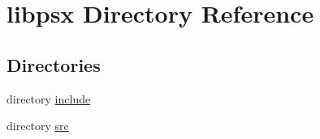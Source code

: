 \hypertarget{dir_000008}{}\section{libpsx Directory Reference}
\label{dir_000008}
\subsection*{Directories}
\begin{DoxyCompactItemize}
\item 
directory \hyperlink{dir_000009}{include}
\item 
directory \hyperlink{dir_000011}{src}
\end{DoxyCompactItemize}
